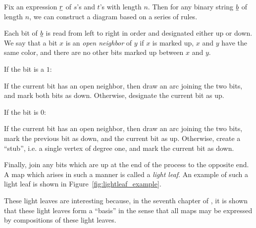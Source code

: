Fix an expression $\underline{r}$ of $s$'s and $t$'s with length $n$.  Then for any binary string $\underline{b}$ of length $n$, we can construct a diagram based on a series of rules.

Each bit of $\underline{b}$ is read from left to right in order and designated either up or down.  We say that a bit $x$ is an \emph{open neighbor} of $y$ if $x$ is marked up, $x$ and $y$ have the same color, and there are no other bits marked up between $x$ and $y$.
\begin{itemize}
	\ii If the bit is a $1$:
	\begin{itemize}
		\ii If the current bit has an open neighbor, then draw an arc joining the two bits, and mark both bits as down.
		\ii Otherwise, designate the current bit as up.
	\end{itemize}
	\ii If the bit is $0$:
	\begin{itemize}
		\ii If the current bit has an open neighbor, then draw an arc joining the two bits, mark the previous bit as down, and the current bit as up.
		\ii Otherwise, create a ``stub'', i.e. a single vertex of degree one, and mark the current bit as down.
	\end{itemize}
\end{itemize}
Finally, join any bits which are up at the end of the process to the opposite end.  A map which arises in such a manner is called a \emph{light leaf}.  An example of such a light leaf is shown in Figure~\ref{fig:lightleaf_example}.

These light leaves are interesting because, in the seventh chapter of \cite{span}, it is shown that these light leaves form a ``basis'' in the sense that all maps may be expressed by compositions of these light leaves.

